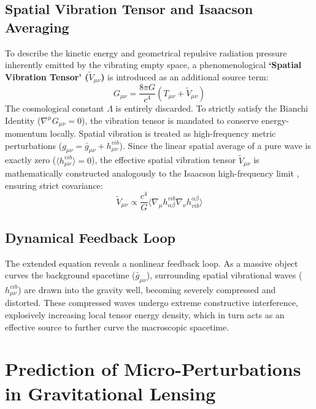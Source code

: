 \documentclass[reprint,amsmath,amssymb,aps,prd]{revtex4-2}
\begin{document}
\subsection{Spatial Vibration Tensor and Isaacson Averaging}
To describe the kinetic energy and geometrical repulsive radiation pressure inherently emitted by the vibrating empty space, a phenomenological \textbf{`Spatial Vibration Tensor' ($\tilde{V}_{\mu\nu}$)} is introduced as an additional source term:
\begin{equation}
G_{\mu\nu} = \frac{8\pi G}{c^4} \left( T_{\mu\nu} + \tilde{V}_{\mu\nu} \right)
\end{equation}
The cosmological constant $\Lambda$ is entirely discarded.
To strictly satisfy the Bianchi Identity ($\nabla^\mu G_{\mu\nu} = 0$), the vibration tensor is mandated to conserve energy-momentum locally.
Spatial vibration is treated as high-frequency metric perturbations ($g_{\mu\nu} = \bar{g}_{\mu\nu} + h_{\mu\nu}^{vib}$).
Since the linear spatial average of a pure wave is exactly zero ($\langle h_{\mu\nu}^{vib} \rangle = 0$), the effective spatial vibration tensor $\tilde{V}_{\mu\nu}$ is mathematically constructed analogously to the Isaacson high-frequency limit \cite{Isaacson1968}, ensuring strict covariance:
\begin{equation}
\tilde{V}_{\mu\nu} \propto \frac{c^4}{G} \langle \nabla_\mu h_{\alpha\beta}^{vib} \nabla_\nu h^{\alpha\beta}_{vib} \rangle
\end{equation}

\subsection{Dynamical Feedback Loop}
The extended equation reveals a nonlinear feedback loop.
As a massive object curves the background spacetime ($\bar{g}_{\mu\nu}$), surrounding spatial vibrational waves ($h_{\mu\nu}^{vib}$) are drawn into the gravity well, becoming severely compressed and distorted.
These compressed waves undergo extreme constructive interference, explosively increasing local tensor energy density, which in turn acts as an effective source to further curve the macroscopic spacetime.

\section{Prediction of Micro-Perturbations in Gravitational Lensing}
\end{document}
